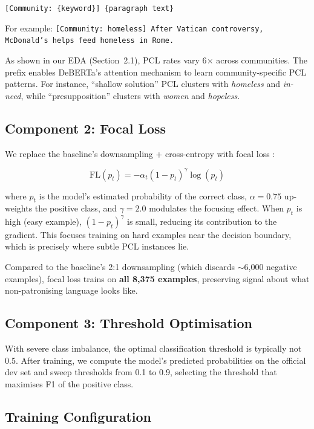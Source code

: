 \documentclass[12pt,twoside]{report}
\begin{document}
\begin{center}
\texttt{[Community: \{keyword\}] \{paragraph text\}}
\end{center}

For example: \texttt{[Community: homeless] After Vatican controversy, McDonald's helps feed homeless in Rome.}

As shown in our EDA (Section~2.1), PCL rates vary 6$\times$ across communities. The prefix enables DeBERTa's attention mechanism to learn community-specific PCL patterns. For instance, ``shallow solution'' PCL clusters with \textit{homeless} and \textit{in-need}, while ``presupposition'' clusters with \textit{women} and \textit{hopeless}.

\subsection{Component 2: Focal Loss}

We replace the baseline's downsampling + cross-entropy with focal loss \cite{lin2017focal}:

\begin{equation}
\text{FL}(p_t) = -\alpha_t (1 - p_t)^\gamma \log(p_t)
\end{equation}

where $p_t$ is the model's estimated probability of the correct class, $\alpha = 0.75$ up-weights the positive class, and $\gamma = 2.0$ modulates the focusing effect. When $p_t$ is high (easy example), $(1 - p_t)^\gamma$ is small, reducing its contribution to the gradient. This focuses training on hard examples near the decision boundary, which is precisely where subtle PCL instances lie.

Compared to the baseline's 2:1 downsampling (which discards $\sim$6,000 negative examples), focal loss trains on \textbf{all 8,375 examples}, preserving signal about what non-patronising language looks like.

\subsection{Component 3: Threshold Optimisation}

With severe class imbalance, the optimal classification threshold is typically not 0.5. After training, we compute the model's predicted probabilities on the official dev set and sweep thresholds from 0.1 to 0.9, selecting the threshold that maximises F1 of the positive class.

\subsection{Training Configuration}
\end{document}
